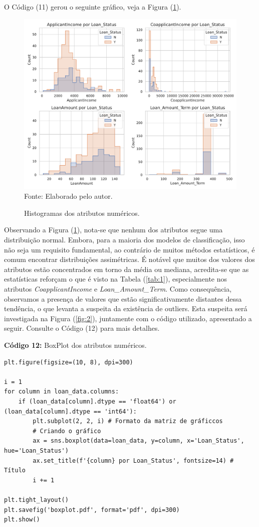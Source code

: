 \documentclass[a4paper,12pt]{article} %
\begin{document}
O Código (11) gerou o seguinte gráfico, veja a Figura (\ref{fig:1}).

\begin{figure}[H]
    \centering
    \caption{Histogramas dos atributos numéricos.}
    \includegraphics[scale=0.65]{Figures/histograma.pdf} \\
    Fonte: Elaborado pelo autor.
    \label{fig:1}
\end{figure}

Observando a Figura (\ref{fig:1}), nota-se que nenhum dos atributos segue uma distribuição normal. Embora, para a maioria dos modelos de classificação, isso não seja um requisito fundamental, ao contrário de muitos métodos estatísticos, é comum encontrar distribuições assimétricas. É notável que muitos dos valores dos atributos estão concentrados em torno da média ou mediana, acredita-se que as estatísticas reforçam o que é visto na Tabela (\ref{tab:1}), especialmente nos atributos \textit{CoapplicantIncome} e \textit{Loan\_Amount\_Term}. Como consequência, observamos a presença de valores que estão significativamente distantes dessa tendência, o que levanta a suspeita da existência de outliers. Esta suspeita será investigada na Figura (\ref{fig:2}), juntamente com o código utilizado, apresentado a seguir. Consulte o Código (12) para mais detalhes.
\begin{center}
\textbf{Código 12:} BoxPlot dos atributos numéricos.
\begin{verbatim}
plt.figure(figsize=(10, 8), dpi=300)

i = 1
for column in loan_data.columns:
    if (loan_data[column].dtype == 'float64') or (loan_data[column].dtype == 'int64'):
        plt.subplot(2, 2, i) # Formato da matriz de gráficcos
        # Criando o gráfico
        ax = sns.boxplot(data=loan_data, y=column, x='Loan_Status', hue='Loan_Status')
        ax.set_title(f'{column} por Loan_Status', fontsize=14) # Título
        i += 1

plt.tight_layout()
plt.savefig('boxplot.pdf', format='pdf', dpi=300)
plt.show()\end{verbatim}
\end{center}
\end{document}
